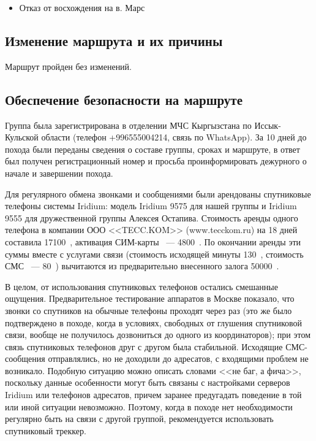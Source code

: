 \begin{itemize}
	\item Отказ от восхождения на в. Марс

\end{itemize}


\subsection{Изменение маршрута и их причины}
Маршрут пройден без изменений.
\subsection{Обеспечение безопасности на маршруте}
Группа была зарегистрирована в отделении МЧС Кыргызстана по Иссык-Кульской области (телефон +996555004214, связь по WhatsApp). За 10 дней до похода были переданы сведения о составе группы, сроках и маршруте, в ответ был получен регистрационный номер и просьба проинформировать дежурного о начале и завершении похода.

Для регулярного обмена звонками и сообщениями были арендованы спутниковые телефоны системы Iridium: модель Iridium 9575  для нашей группы и Iridium 9555 для дружественной группы Алексея  Остапива. Стоимость аренды одного телефона в компании ООО <<TECC.KOM>> (www.tecckom.ru) на 18 дней составила 17100~\faRub, активация СИМ-карты ~--- 4800~\faRub. По окончании аренды эти суммы вместе с услугами связи (стоимость исходящей минуты 130~\faRub, стоимость СМС ~--- 80~\faRub) вычитаются из предварительно внесенного залога 50000~\faRub. 

В целом, от использования спутниковых телефонов остались смешанные ощущения. Предварительное тестирование аппаратов в Москве показало, что звонки со спутников на обычные телефоны проходят через раз (это же было подтверждено в походе, когда в условиях, свободных от глушения спутниковой связи, вообще не получилось дозвониться до одного из координаторов); при этом связь спутниковых телефонов друг с другом была стабильной. Исходящие СМС-сообщения отправлялись, но не доходили до адресатов, с входящими проблем не возникало. Подобную ситуацию можно описать словами <<не баг, а фича>>, поскольку данные особенности могут быть связаны с настройками серверов Iridium или телефонов адресатов, причем заранее предугадать поведение в той или иной ситуации невозможно. Поэтому, когда в походе нет необходимости регулярно быть на связи с другой группой, рекомендуется использовать спутниковый треккер.

